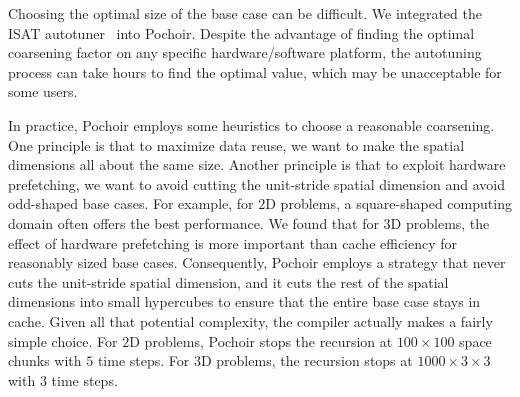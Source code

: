 Choosing the optimal size of the base case can be difficult.  We
integrated the ISAT autotuner~\cite{Isat10} into Pochoir.  Despite the
advantage of finding the optimal coarsening factor on any specific
hardware/software platform, the autotuning process can take hours to
find the optimal value, which may be unacceptable for some users.  

In practice, Pochoir employs some heuristics to choose a reasonable
coarsening.  One principle is that to maximize data reuse, we want to
make the spatial dimensions all about the same size.  Another
principle is that to exploit hardware prefetching, we want to avoid
cutting the unit-stride spatial dimension and avoid odd-shaped base
cases.  For example, for $2$D problems, a square-shaped computing
domain often offers the best performance.  We found that for $3$D
problems, the effect of hardware prefetching is more important than
cache efficiency for reasonably sized base cases.  Consequently,
Pochoir employs a strategy that never cuts the unit-stride spatial
dimension, and it cuts the rest of the spatial dimensions into small
hypercubes to ensure that the entire base case stays in cache.  Given
all that potential complexity, the compiler actually makes a fairly
simple choice.  For $2$D problems, Pochoir stops the recursion at
$100\times 100$ space chunks with $5$ time steps.  For $3$D problems,
the recursion stops at $1000\times 3 \times 3$ with $3$ time steps.
  

